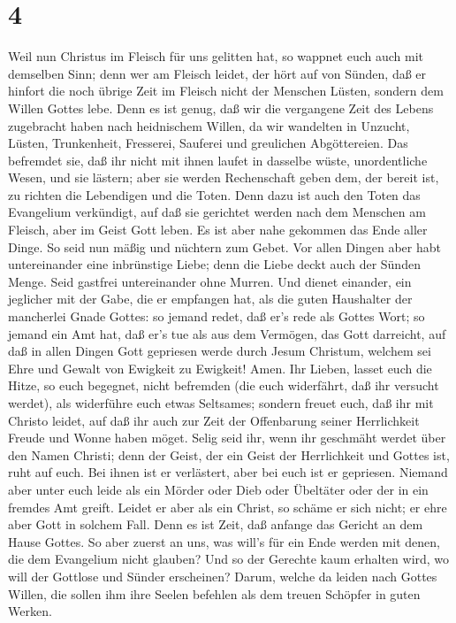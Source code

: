 \hypertarget{section-3}{%
\section{4}\label{section-3}}

 Weil nun Christus im Fleisch für uns gelitten hat, so
wappnet euch auch mit demselben Sinn; denn wer am Fleisch leidet, der
hört auf von Sünden,  daß er hinfort die noch übrige Zeit im
Fleisch nicht der Menschen Lüsten, sondern dem Willen Gottes lebe.
 Denn es ist genug, daß wir die vergangene Zeit des Lebens
zugebracht haben nach heidnischem Willen, da wir wandelten in Unzucht,
Lüsten, Trunkenheit, Fresserei, Sauferei und greulichen Abgöttereien.
 Das befremdet sie, daß ihr nicht mit ihnen laufet in
dasselbe wüste, unordentliche Wesen, und sie lästern;  aber
sie werden Rechenschaft geben dem, der bereit ist, zu richten die
Lebendigen und die Toten.  Denn dazu ist auch den Toten das
Evangelium verkündigt, auf daß sie gerichtet werden nach dem Menschen am
Fleisch, aber im Geist Gott leben.  Es ist aber nahe
gekommen das Ende aller Dinge.  So seid nun mäßig und
nüchtern zum Gebet. Vor allen Dingen aber habt untereinander eine
inbrünstige Liebe; denn die Liebe deckt auch der Sünden Menge.
 Seid gastfrei untereinander ohne Murren.  Und
dienet einander, ein jeglicher mit der Gabe, die er empfangen hat, als
die guten Haushalter der mancherlei Gnade Gottes:  so
jemand redet, daß er's rede als Gottes Wort; so jemand ein Amt hat, daß
er's tue als aus dem Vermögen, das Gott darreicht, auf daß in allen
Dingen Gott gepriesen werde durch Jesum Christum, welchem sei Ehre und
Gewalt von Ewigkeit zu Ewigkeit! Amen.  Ihr Lieben, lasset
euch die Hitze, so euch begegnet, nicht befremden (die euch widerfährt,
daß ihr versucht werdet), als widerführe euch etwas Seltsames;
 sondern freuet euch, daß ihr mit Christo leidet, auf daß
ihr auch zur Zeit der Offenbarung seiner Herrlichkeit Freude und Wonne
haben möget.  Selig seid ihr, wenn ihr geschmäht werdet
über den Namen Christi; denn der Geist, der ein Geist der Herrlichkeit
und Gottes ist, ruht auf euch. Bei ihnen ist er verlästert, aber bei
euch ist er gepriesen.  Niemand aber unter euch leide als
ein Mörder oder Dieb oder Übeltäter oder der in ein fremdes Amt greift.
 Leidet er aber als ein Christ, so schäme er sich nicht; er
ehre aber Gott in solchem Fall.  Denn es ist Zeit, daß
anfange das Gericht an dem Hause Gottes. So aber zuerst an uns, was
will's für ein Ende werden mit denen, die dem Evangelium nicht glauben?
 Und so der Gerechte kaum erhalten wird, wo will der
Gottlose und Sünder erscheinen?  Darum, welche da leiden
nach Gottes Willen, die sollen ihm ihre Seelen befehlen als dem treuen
Schöpfer in guten Werken.

